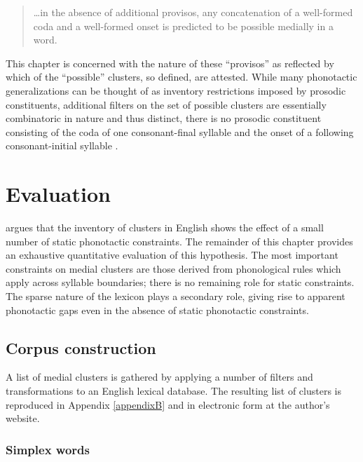 \begin{quote}
\ldots{}in the absence of additional provisos, any concatenation of a well-formed coda and a well-formed onset is predicted to be possible medially in a word. \citep[][168]{Pierrehumbert1994}
\end{quote}

This chapter is concerned with the nature of these ``provisos'' as reflected by which of the ``possible'' clusters, so defined, are attested. While many phonotactic generalizations can be thought of as inventory restrictions imposed by prosodic constituents, additional filters on the set of possible clusters are essentially combinatoric in nature and thus distinct, there is no prosodic constituent consisting of the coda of one consonant-final syllable and the onset of a following consonant-initial syllable \citep[though see][]{Steriade1999}.

\section{Evaluation}

\citeauthor{Pierrehumbert1994} argues that the inventory of clusters in English shows the effect of a small number of static phonotactic constraints. The remainder of this chapter provides an exhaustive quantitative evaluation of this hypothesis. The most important constraints on medial clusters are those derived from phonological rules which apply across syllable boundaries; there is no remaining role for static constraints. The sparse nature of the lexicon plays a secondary role, giving rise to apparent phonotactic gaps even in the absence of static phonotactic constraints.

\subsection{Corpus construction}

A list of medial clusters is gathered by applying a number of filters and transformations to an English lexical database. The resulting list of clusters is reproduced in Appendix \ref{appendixB} and in electronic form at the author's website.

\subsubsection{Simplex words}


